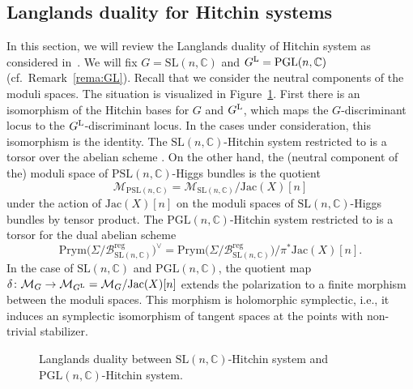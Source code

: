 \documentclass[10pt,a4paper]{amsart}
\numberwithin{equation}{section}
\theoremstyle{definition}
\newcommand{\reg}{\mathrm{reg}}
\newcommand{\Jac}{\mathrm{Jac}}
\renewcommand{\to}{\rightarrow}
\newcommand{\calB}{\mathcal{B}}
\newcommand{\calM}{\mathcal{M}}
\newcommand{\CC}{\mathbb{C}}
\newcommand{\Prym}{\mathrm{Prym}}
\newcommand{\SL}{\mathrm{SL}}
\newcommand{\PSL}{\mathrm{PSL}}
\newcommand{\PGL}{\mathrm{PGL}}
\begin{document}
\subsection{Langlands duality for Hitchin systems}
In this section, we will review the Langlands duality of Hitchin system as considered in~\cite{DonagiPantev}. We will fix $G=\SL(n,\CC)$ and $G^{\rm L}=\PGL(n,\CC)$ (cf.\ Remark~\ref{rema:GL}). Recall that we consider the neutral components of the moduli spaces. The situation is visualized in Figure~\ref{fig:Langlands}. First there is an isomorphism of the Hitchin bases for $G$ and $G^{\rm L}$, which maps the $G$-discriminant locus to the $G^{\rm L}$-discriminant locus. In the cases under consideration, this isomorphism is the identity. The $\SL(n,\CC)$-Hitchin system restricted to \smash{$\calB_{\SL(n,\CC)}^\reg$} is a torsor over the abelian scheme \smash{$\Prym(\Sigma/\calB^{\reg}_{\SL(n,\CC)})$}. On the other hand, the (neutral component of the) moduli space of $\PSL(n,\CC)$-Higgs bundles is the quotient
\[ \calM_{\PSL(n,\CC)} = \calM_{\SL(n,\CC)}/\Jac(X)[n]
\] under the action of $\Jac(X)[n]$ on the moduli spaces of $\SL(n,\CC)$-Higgs bundles by tensor product. The $\PGL(n,\CC)$-Hitchin system restricted to \smash{$\calB^\reg_{\PSL(n,\CC)}$} is a torsor for the dual abelian scheme
\[
\Prym\bigl(\Sigma/\calB^{\reg}_{\SL(n,\CC)}\bigr)^\vee=\Prym\bigl(\Sigma/\calB^{\reg}_{\SL(n,\CC)}\bigr)/\pi^*\Jac(X)[n].
\] In the case of $\SL(n,\CC)$ and $\PGL(n,\CC)$, the quotient map $\delta\colon \calM_G \to \calM_{G^{\rm L}}=\calM_G/\Jac(X)[n]$ extends the polarization to a finite morphism between the moduli spaces. This morphism is holomorphic symplectic, i.e., it induces an symplectic isomorphism of tangent spaces at the points with non-trivial stabilizer.
\begin{figure}[t]
 \centering

 \vspace{-2mm}

 \caption{Langlands duality between $\SL(n,\CC)$-Hitchin system and $\PGL(n,\CC)$-Hitchin system.}\label{fig:Langlands}
\end{figure}
\end{document}
